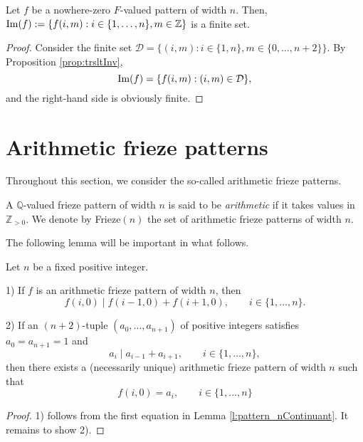 \begin{corollary}
    \label{cor:imageFinite}
    Let $f$ be a nowhere-zero $F$-valued pattern of width $n$. Then, ${\rm Im}(f) := \{f (i,m) : i \in \{1,\ldots, n\}, m \in \mathbb{Z}\}$ is
    a finite set. 
\end{corollary}
\begin{proof}
    Consider the finite set $\mathcal{D} = \{(i,m) : i \in \{1,n\}, m \in \{0,\ldots, n+2\}\}$. By Proposition \ref{prop:trsltInv}, 
    \[
        {\rm Im}(f) = \{f (i,m) : (i,m) \in \mathcal{D}\},
    \]
    and the right-hand side is obviously finite. 
\end{proof}

\section{Arithmetic frieze patterns}
Throughout this section, we consider the so-called arithmetic frieze patterns.

\begin{definition}
    \label{def:arith_fp}
        A $\mathbb{Q}$-valued frieze pattern of width $n$ is said to be \textit{arithmetic} if it takes values in $\mathbb{Z}_{>0}$. 
        We denote by Frieze$(n)$ the set of arithmetic frieze patterns of width $n$. 
\end{definition}

The following lemma will be important in what follows. 
\begin{lemma}
    \label{l:testCriteria}
    Let $n$ be a fixed positive integer. 

    1) If $f$ is an arithmetic frieze pattern of width $n$, then
    \[
        f (i,0) \mid f (i-1,0) + f (i+1,0), \qquad i \in \{1, \ldots, n\}.
    \]

    2) If an $(n+2)$-tuple $(a_0, \ldots, a_{n+1})$ of positive integers satisfies $a_0 = a_{n+1} =1$ and 
    \[
        a_i \mid a_{i-1} + a_{i+1}, \qquad i \in \{1, \ldots, n\},
    \]
    then there exists a (necessarily unique) arithmetic frieze pattern of width $n$ such that 
    \[
        f(i,0) = a_i, \qquad i \in \{1, \ldots, n\}
    \]
\end{lemma}
\begin{proof}
    1) follows from the first equation in Lemma \ref{l:pattern_nContinuant}. It remains to show 2). 
\end{proof}

